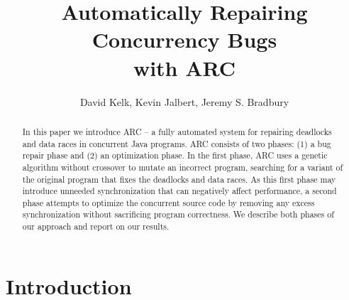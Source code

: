 \documentclass{llncs}
\begin{document}
\title{Automatically Repairing Concurrency Bugs\\ with ARC}

\author{David Kelk, Kevin Jalbert, Jeremy S. Bradbury}


\maketitle

\begin{abstract}

In this paper we introduce ARC -- a fully automated system for repairing deadlocks and data races in concurrent Java programs. ARC consists of two phases: (1) a bug repair phase and (2) an optimization phase. In the first phase, ARC uses a genetic algorithm without crossover to mutate an incorrect program, searching for a variant of the original program that fixes the deadlocks and data races. As this first phase may introduce unneeded synchronization that can negatively affect performance, a second phase attempts to optimize the concurrent source code by removing any excess synchronization without sacrificing program correctness. We describe both phases of our approach and report on our results.

\end{abstract}

 \section{Introduction}
\label{sec:introduction}
\end{document}
